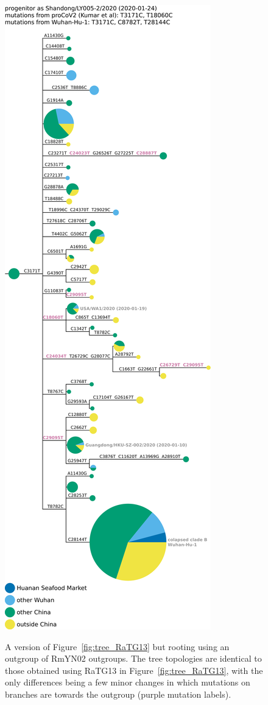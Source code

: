 \documentclass[9pt,twocolumn,twoside]{gsajnl_modified}
\begin{document}
\begin{figure}[h!]
{  \hspace{0.04\linewidth}
 \includegraphics[width=0.31\linewidth, valign=t, clip=true, trim=0in 4.4in 0in 0in]{figures/tree_images/hCoV-19-Shandong-LY005-2-2020_RmYN02_without_deleted_seqs.pdf}
 }
 \caption{
 A version of Figure~\ref{fig:tree_RaTG13} but rooting using an outgroup of RmYN02 outgroups.
 The tree topologies are identical to those obtained using RaTG13 in Figure~\ref{fig:tree_RaTG13}, with the only differences being a few minor changes in which mutations on branches are towards the outgroup (purple mutation labels).
\label{suppfig:tree_RmYN02}
 }
 \end{figure}
\end{document}
